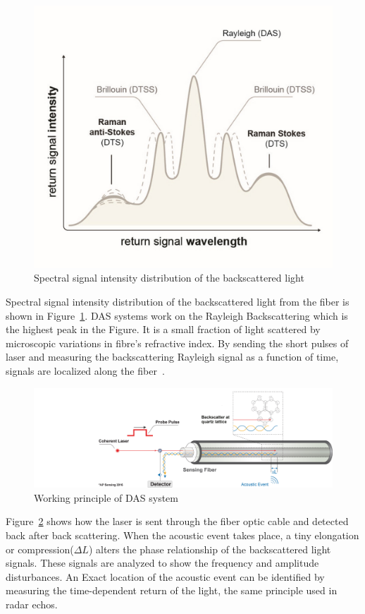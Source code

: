 \begin{figure}[h]
    \centering
    \includegraphics[width=0.7\linewidth]{Bilder/jpg/COTDR.jpg}
    \caption{Spectral signal intensity distribution of the backscattered light~\cite{DAS_Manual}}
    \label{COTDR}
\end{figure}
 
Spectral signal intensity distribution of the backscattered light from the fiber is shown in Figure~\ref{COTDR}. DAS systems work on the Rayleigh Backscattering which is the highest peak in the Figure. It is a small fraction of light scattered by microscopic variations in fibre's refractive index. By sending the short pulses of laser and measuring the backscattering Rayleigh signal as a function of time, signals are localized along the fiber~\cite{masoudi}.  

\begin{figure}[h]
    \centering
    \includegraphics[width=0.7\linewidth]{Bilder/jpg/DAS_Acoustic_Event.jpg}
    \caption{Working principle of DAS system~\cite{DAS_Manual}}
    \label{DAS_working}
\end{figure}

Figure~\ref{DAS_working} shows how the laser is sent through the fiber optic cable and detected back after back scattering. When the acoustic event takes place, a tiny elongation or compression($\Delta L$) alters the phase relationship of the backscattered light signals. These signals are analyzed to show the frequency and amplitude disturbances. An Exact location of the acoustic event can be identified by measuring the time-dependent return of the light,  the same principle used in radar echos. 

